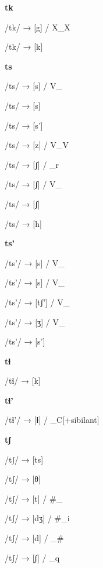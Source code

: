 \begin{center}\textbf{tk}\end{center}
\begin{multicols}{4}
\noindent /tk/ → [g] / X\_X

\noindent /tk/ → [k]

\end{multicols}

\begin{center}\textbf{ts}\end{center}
\begin{multicols}{4}
\noindent /ts/ → [s] / V\_

\noindent /ts/ → [s]

\noindent /ts/ → [s']

\noindent /ts/ → [z] / V\_V

\noindent /ts/ → [ʃ] / \_r

\noindent /ts/ → [ʃ] / V\_

\noindent /ts/ → [ʃ]

\noindent /ts/ → [h]
\end{multicols}

\begin{center}\textbf{ts'}\end{center}
\begin{multicols}{4}
\noindent /ts'/ → [s] / V\_

\noindent /ts'/ → [s] / V\_

\noindent /ts'/ → [tʃ'] / V\_

\noindent /ts'/ → [ʒ] / V\_

\noindent /ts'/ → [s']
\end{multicols}

\begin{center}\textbf{tɬ}\end{center}
\begin{multicols}{4}
\noindent /tɬ/ → [k]
\end{multicols}


\begin{center}\textbf{tɬ'}\end{center}
\begin{multicols}{4}
\noindent /tɬ'/ → [ɬ] / \_C[+sibilant]
\end{multicols}


\begin{center}\textbf{tʃ}\end{center}
\begin{multicols}{4}
\noindent /tʃ/ → [ts]

\noindent /tʃ/ → [θ]

\noindent /tʃ/ → [t] / \#\_

\noindent /tʃ/ → [dʒ] / \#\_i

\noindent /tʃ/ → [d] / \_\#

\noindent /tʃ/ → [ʃ] / \_q

\end{multicols}

